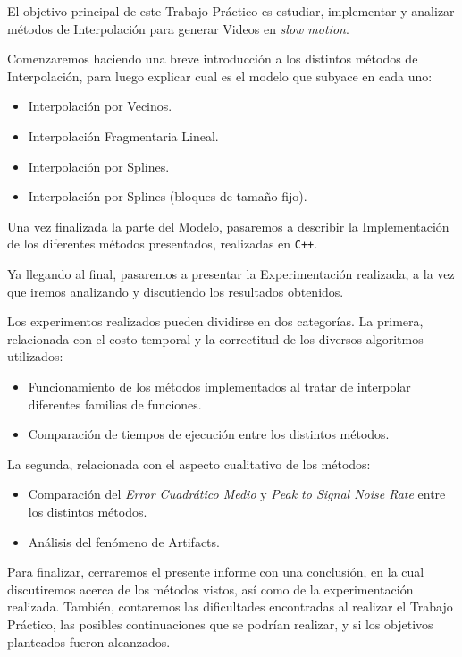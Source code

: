  El objetivo principal de este Trabajo Práctico es estudiar, implementar y analizar
 métodos de Interpolación para generar Videos en \textit{slow motion}.

Comenzaremos haciendo una breve introducción a los distintos métodos de Interpolación,
para luego explicar cual es el modelo que subyace en cada uno:
\begin{itemize}
    \item Interpolación por Vecinos.
    \item Interpolación Fragmentaria Lineal.
    \item Interpolación por Splines.
    \item Interpolación por Splines (bloques de tamaño fijo).
\end{itemize}

Una vez finalizada la parte del Modelo, pasaremos a describir la Implementación de los
diferentes métodos presentados, realizadas en \texttt{C++}.

Ya llegando al final, pasaremos a presentar la Experimentación realizada, a la vez
que iremos analizando y discutiendo los resultados obtenidos.

Los experimentos realizados pueden dividirse en dos categorías. La primera, relacionada
con el costo temporal y la correctitud de los diversos algoritmos utilizados:
\begin{itemize}
    \item Funcionamiento de los métodos implementados al tratar de interpolar diferentes
        familias de funciones.
    \item Comparación de tiempos de ejecución entre los distintos métodos.
\end{itemize}

La segunda, relacionada con el aspecto cualitativo de los métodos:
\begin{itemize}
    \item Comparación del \textit{Error Cuadrático Medio} y \textit{Peak to Signal Noise Rate} entre
        los distintos métodos.
    \item Análisis del fenómeno de Artifacts.
\end{itemize}

Para finalizar, cerraremos el presente informe con una conclusión, en la cual
discutiremos acerca de los métodos vistos, así como de la experimentación realizada.
También, contaremos las dificultades encontradas al realizar el Trabajo Práctico,
las posibles continuaciones que se podrían realizar, y si los objetivos planteados
fueron alcanzados.
